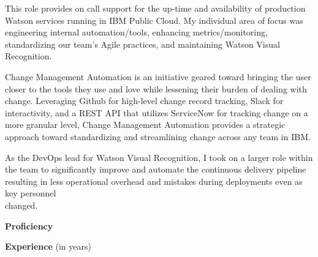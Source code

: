 \documentclass[10pt,a4paper,ragged2e,withhyper]{altacv}
\begin{document}
\begin{paracol}{2}
\divider

This role provides on call support for the up-time and availability of production Watson services running in IBM Public Cloud. My individual area of focus was engineering internal automation/tools, enhancing metrics/monitoring, standardizing our team's Agile practices, and maintaining Watson Visual Recognition.

\medskip


Change Management Automation is an initiative geared toward bringing the user closer to the tools they use and love while lessening their burden of dealing with change. Leveraging Github for high-level change record tracking, Slack for interactivity, and a REST API that utilizes ServiceNow for tracking change on a more granular level, Change Management Automation provides a strategic approach toward standardizing and streamlining change across any team in IBM.

\divider

As the DevOps lead for Watson Visual Recognition, I took on a larger role within the team to significantly improve and automate the continuous delivery pipeline resulting in less operational overhead and mistakes during deployments even as key personnel \\changed.

\switchcolumn
\smallskip
{}

\textcolor{accent}{\textbf{Proficiency}}\smallskip








\divider

\textcolor{blueaccent}{\textbf{Experience}} (in years)\smallskip


\end{paracol}
\end{document}
